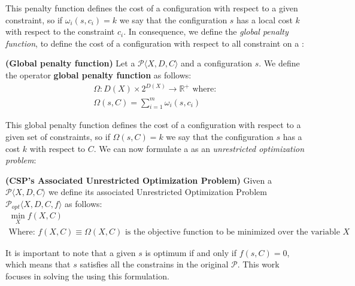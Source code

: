 This penalty function defines the cost of a configuration with respect to a given constraint, so if $\omega_i\left(s,c_i\right)=k$ we say that the configuration $s$ has a local cost $k$ with respect to the constraint $c_i$. In consequence, we define the \textit{global penalty function}, to define the cost of a configuration with respect to all constraint on a \csp:

\begin{definition}{\bf (Global penalty function)}
\label{def:global_cost}
Let a {\bf \csp} $\mathcal{P}\langle X,D,C \rangle$ and a configuration $s$. We define the operator {\bf global penalty function} as follows: 
\begin{equation*}
\begin{array}{l}
\Omega:D\left(X\right)\times 2^{D\left(X\right)}\rightarrow\mathbb{R}^+ \text{ where: }\\
\Omega\left(s,C\right)=\displaystyle\sum_{i=1}^{m}{\omega_i\left(s,c_i\right)}
\end{array}
\end{equation*}
\end{definition}

This global penalty function defines the cost of a configuration with respect to a given set of constraints, so if $\Omega\left(s,C\right)=k$ we say that the configuration $s$ has a cost $k$ with respect to $C$. We can now formulate a \CSP{} as an {\it unrestricted optimization problem}:

\begin{definition}{\bf (CSP's Associated Unrestricted Optimization Problem)}
\label{def:ass_CSP}
Given a {\bf \csp} $\mathcal{P}\langle X,D,C \rangle$ we define its associated Unrestricted Optimization Problem $\mathcal{P}_{opt}\langle X,D,C,f \rangle$ as follows: 
\begin{equation*}
\begin{array}{l}
\displaystyle\min_{X} f\left(X,C\right)\\
\text{Where:  } f\left(X,C\right) \equiv \Omega\left(X,C\right) \text{ is the objective function to be minimized over the variable } X
\end{array}
\end{equation*}
\end{definition}

It is important to note that a given $s$ is optimum if and only if $f\left(s,C\right) = 0$, which means that $s$ satisfies all the constrains in the original \csp{} $\mathcal{P}$. This work focuses in solving the \CSP{} using this formulation.